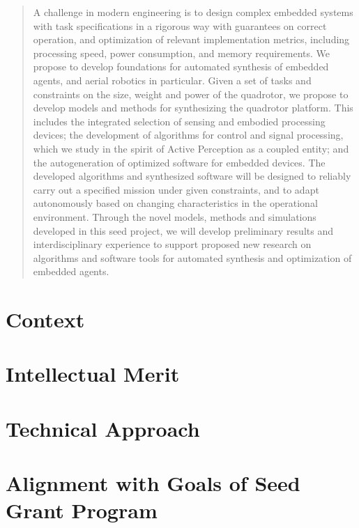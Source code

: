 \documentclass[12pt]{article}
\begin{document}
\vspace{.14in}
\begin{abstract}

A challenge in modern engineering is to design complex embedded systems with
task specifications in a rigorous way with guarantees on correct operation, and
optimization of relevant implementation metrics, including processing speed,
power consumption, and memory requirements. We propose to develop foundations
for automated synthesis of embedded agents, and aerial robotics in particular.
Given a set of tasks and constraints on the size, weight and power of the
quadrotor, we propose to develop models and methods for synthesizing the
quadrotor platform. This includes the integrated selection of sensing and
embodied processing devices; the development of algorithms for control and
signal processing, which we study in the spirit of Active Perception as a
coupled entity; and the autogeneration of optimized software for embedded
devices. The developed algorithms and synthesized software
will be designed to reliably carry out a specified mission under
given constraints, and to adapt autonomously based on
changing characteristics in the operational environment. Through the novel models, methods and simulations developed in this
seed project, we will develop preliminary results and interdisciplinary
experience to support proposed new research on algorithms and software tools
for automated synthesis and optimization of embedded agents. 

\end{abstract}

\section{Context}
\label{sec:context}


\section{Intellectual Merit}
\label{sec:merit}


\section{Technical Approach}
\label{sec:approach}


\section{Alignment with Goals of Seed Grant Program}
\label{sec:alignment}

\end{document}
